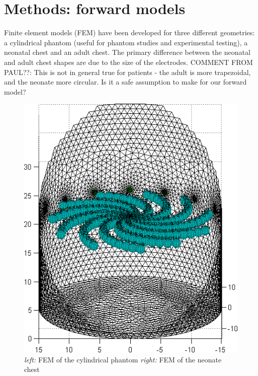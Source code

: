\documentclass[12pt]{iopart}
\begin{document}
\section{Methods: forward models}

Finite element models (FEM) have been developed for three
different geometries: a cylindrical phantom (useful for 
phantom studies and experimental testing), a
neonatal chest and an adult chest. The primary difference
between the neonatal and adult chest shapes are due to
the size of the electrodes.
COMMENT FROM PAUL??:
This is not in general true for patients - the adult is more trapezoidal, and the neonate more circular. Is it a safe assumption to make for our forward model?

\begin{figure}[bhtp]
\begin{center}
  \includegraphics[width= 0.4 \textwidth, bb=0 0 444 517]
         {../../tutorial/GREIT-evaluation/simulation_3d_test02a.png}

\caption{ \label{fig:fm2}
{\em left:} FEM of the cylindrical phantom
{\em right:} FEM of the neonate chest 
}
\end{center}
\end{figure}
\end{document}
